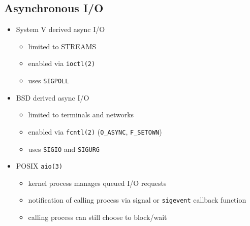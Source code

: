 \documentclass[xga]{xdvislides}
\begin{document}
\subsection{Asynchronous I/O}
\begin{itemize}
	\item System V derived async I/O
		\begin{itemize}
			\item limited to STREAMS
			\item enabled via {\tt ioctl(2)}
			\item uses {\tt SIGPOLL}
		\end{itemize}
	\item BSD derived async I/O
		\begin{itemize}
			\item limited to terminals and networks
			\item enabled via {\tt fcntl(2)} ({\tt O\_ASYNC},
{\tt  F\_SETOWN})
			\item uses {\tt SIGIO} and {\tt SIGURG}
		\end{itemize}
	\item POSIX \verb+aio(3)+
		\begin{itemize}
			\item kernel process manages queued I/O requests
			\item notification of calling process via signal or \verb+sigevent+ callback function
			\item calling process can still choose to block/wait
		\end{itemize}
\end{itemize}
\end{document}
